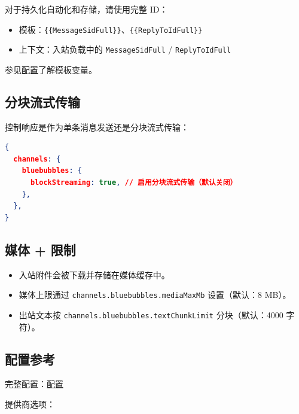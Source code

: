 对于持久化自动化和存储，请使用完整 ID：

\begin{itemize}
  \item 模板：\texttt{\{\{MessageSidFull\}\}}、\texttt{\{\{ReplyToIdFull\}\}}
  \item 上下文：入站负载中的 \texttt{MessageSidFull} / \texttt{ReplyToIdFull}
\end{itemize}


参见\href{/gateway/configuration}{配置}了解模板变量。

\subsection{分块流式传输}


控制响应是作为单条消息发送还是分块流式传输：

\begin{lstlisting}[language=json]
{
  channels: {
    bluebubbles: {
      blockStreaming: true, // 启用分块流式传输（默认关闭）
    },
  },
}
\end{lstlisting}


\subsection{媒体 + 限制}


\begin{itemize}
  \item 入站附件会被下载并存储在媒体缓存中。
  \item 媒体上限通过 \texttt{channels.bluebubbles.mediaMaxMb} 设置（默认：8 MB）。
  \item 出站文本按 \texttt{channels.bluebubbles.textChunkLimit} 分块（默认：4000 字符）。
\end{itemize}


\subsection{配置参考}


完整配置：\href{/gateway/configuration}{配置}

提供商选项：


